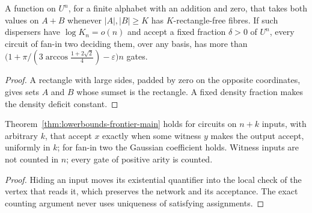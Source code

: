 \begin{theorem}
  \label{thm:lowerbounds-frontier-sumset-disperser}
  \leanok
  A function on $U^n$, for a finite alphabet with an addition and zero, that takes
  both values on $A+B$ whenever $|A|,|B|\ge K$ has $K$-rectangle-free fibres. If
  such dispersers have $\log K_n=o(n)$ and accept a fixed fraction $\delta>0$ of
  $U^n$, every circuit of fan-in two deciding them, over any basis, has more
  than $\bigl(1+\pi/(3\arccos\tfrac{1+2\sqrt2}{4})-\varepsilon\bigr)n$ gates.
\end{theorem}
\begin{proof}
  \leanok
  A rectangle with large sides, padded by zero on the opposite coordinates, gives
  sets $A$ and $B$ whose sumset is the rectangle. A fixed density fraction makes
  the density deficit constant.
\end{proof}

\begin{theorem}
  \label{thm:lowerbounds-frontier-nondeterministic}
  \leanok
  Theorem~\ref{thm:lowerbounds-frontier-main} holds for circuits on $n+k$
  inputs, with arbitrary $k$, that accept $x$ exactly when some witness $y$ makes
  the output accept, uniformly in $k$; for fan-in two the Gaussian coefficient
  holds. Witness inputs are not counted in $n$; every gate of positive arity is
  counted.
\end{theorem}
\begin{proof}
  \leanok
  Hiding an input moves its existential quantifier into the local check of the
  vertex that reads it, which preserves the network and its acceptance. The exact
  counting argument never uses uniqueness of satisfying assignments.
\end{proof}

